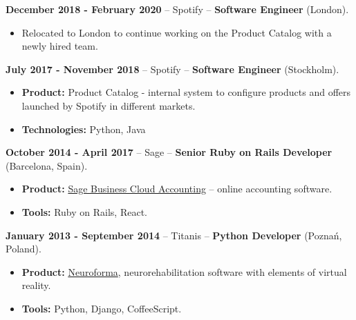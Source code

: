 \documentclass[10pt]{article}
\newenvironment{outerlist}[1][\enskip\textbullet]%
        {\begin{itemize}[#1]}{\end{itemize}%
         \vspace{-.6\baselineskip}}
\begin{document}
\textbf{December 2018 - February 2020} -- Spotify -- \textbf{Software Engineer} (London).
	\begin{outerlist}
		\item[] Relocated to London to continue working on the Product Catalog with a newly hired team.\\
	\end{outerlist}

\textbf{July 2017 - November 2018} -- Spotify -- \textbf{Software Engineer} (Stockholm).

	\begin{outerlist}
		\item[] \textbf{Product:} Product Catalog - internal system to configure products and offers launched by Spotify in different markets.
		\item[] \textbf{Technologies:} Python, Java\\
	\end{outerlist}

\textbf{October 2014 - April 2017} -- Sage -- \textbf{Senior Ruby on Rails Developer}\\(Barcelona, Spain).

\begin{itemize}
  \item \textbf{Product:} \href{http://uk.sageone.com/}{Sage Business Cloud Accounting} -- online accounting software.
  \item \textbf{Tools:} Ruby on Rails, React.\\
\end{itemize}

\textbf{January 2013 - September 2014} -- Titanis -- \textbf{Python Developer} (Poznań, Poland).

\begin{itemize}
 \item \textbf{Product:} \href{http://neuro-forma.com}{Neuroforma}, neurorehabilitation software with elements of virtual reality.
 \item \textbf{Tools:} Python, Django, CoffeeScript.
\end{itemize}


\end{document}
